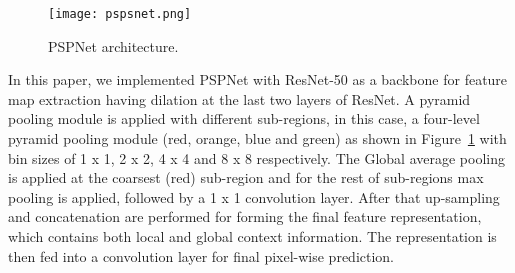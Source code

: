 	\begin{figure} [h!]
		\begin{center}
			\texttt{[image: pspsnet.png]}
		\end{center}
		\caption{PSPNet architecture.} 
		\label{fig:PSPNet}
	\end{figure}
	
	\begin{comment}As it is shown in the Figure that the initial feature maps are extracted from input images by employing ResNet architecture along with dilation. A pyramid pooling module is applied with different sub-region representations. After that up-sampling and concatenation are performed for forming the final feature representation, which contains both local and global context information. The representation is then fed into a convolution layer for final pixel wise prediction.\end{comment} 
	In this paper, we implemented PSPNet with ResNet-50 as a backbone for feature map extraction having dilation at the last two layers of ResNet.  A pyramid pooling module is applied with different sub-regions, in this case, a four-level pyramid pooling module (red, orange, blue and green) as shown in Figure~\ref{fig:PSPNet} with bin sizes of 1 x 1, 2 x 2, 4 x 4 and 8 x 8 respectively. The Global average pooling is applied at the coarsest (red) sub-region and for the rest of sub-regions max pooling is applied, followed by a 1 x 1 convolution layer. After that up-sampling and concatenation are performed for forming the final feature representation, which contains both local and global context information. The representation is then fed into a convolution layer for final pixel-wise prediction. 
	
\begin{comment}We have implemented two versions of PSPNet models:
1) With softmax activiation function. 2) and with sigmoid activation function, both at the output layer.\end{comment}
